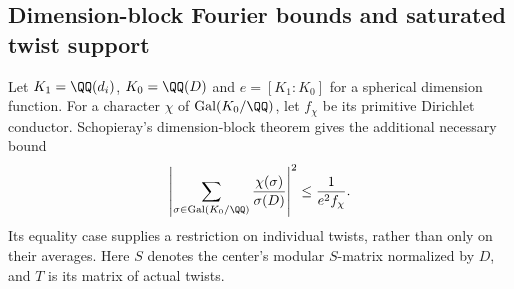 \subsection{Dimension-block Fourier bounds and saturated twist support}
\label{subsec:dimension-block-support}
Let $K_1=\QQ(d_i)$, $K_0=\QQ(D)$ and $e=[K_1:K_0]$ for a spherical
dimension function. For a character $\chi$ of
$\operatorname{Gal}(K_0/\QQ)$, let $f_\chi$ be its primitive Dirichlet
conductor. Schopieray's dimension-block theorem
\cite[Theorem~5.1]{SchDimensionBlock} gives the additional necessary bound
\begin{equation}\label{eq:dimension-block-fourier-bound}
 \left|\sum_{\sigma\in\operatorname{Gal}(K_0/\QQ)}
       \frac{\chi(\sigma)}{\sigma(D)}\right|^2
 \le \frac1{e^2 f_\chi}.
\end{equation}
Its equality case supplies a restriction on individual twists, rather
than only on their averages. Here $S$ denotes the center's modular
$S$-matrix normalized by $D$, and $T$ is its matrix of actual twists.

